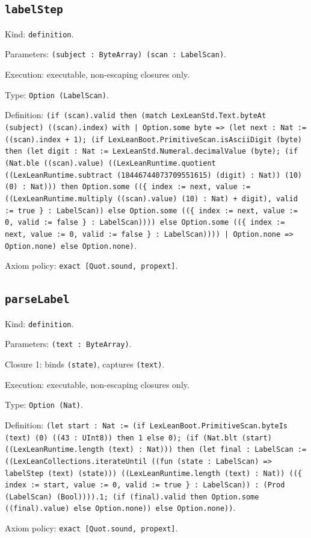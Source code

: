 \documentclass[11pt]{article}
\begin{document}
\subsection*{\texttt{labelStep}}
\noindent Kind: \texttt{definition}.\par
\noindent Parameters: \texttt{(subject : ByteArray) (scan : LabelScan)}.\par
\noindent Execution: executable, non-escaping closures only.\par
\noindent Type: \texttt{Option (LabelScan)}.\par
\noindent Definition: \texttt{(if (scan).valid then (match LexLeanStd.Text.byteAt (subject) ((scan).index) with | Option.some byte => (let next : Nat := ((scan).index + 1); (if LexLeanBoot.PrimitiveScan.isAsciiDigit (byte) then (let digit : Nat := LexLeanStd.Numeral.decimalValue (byte); (if (Nat.ble ((scan).value) ((LexLeanRuntime.quotient ((LexLeanRuntime.subtract (18446744073709551615) (digit) : Nat)) (10) (0) : Nat))) then Option.some ((\{ index := next, value := ((LexLeanRuntime.multiply ((scan).value) (10) : Nat) + digit), valid := true \} : LabelScan)) else Option.some ((\{ index := next, value := 0, valid := false \} : LabelScan)))) else Option.some ((\{ index := next, value := 0, valid := false \} : LabelScan)))) | Option.none => Option.none) else Option.none)}.\par
\noindent Axiom policy: \texttt{exact [Quot.sound, propext]}.\par
\subsection*{\texttt{parseLabel}}
\noindent Kind: \texttt{definition}.\par
\noindent Parameters: \texttt{(text : ByteArray)}.\par
\noindent Closure 1: binds \texttt{(state)}, captures \texttt{(text)}.\par
\noindent Execution: executable, non-escaping closures only.\par
\noindent Type: \texttt{Option (Nat)}.\par
\noindent Definition: \texttt{(let start : Nat := (if LexLeanBoot.PrimitiveScan.byteIs (text) (0) ((43 : UInt8)) then 1 else 0); (if (Nat.blt (start) ((LexLeanRuntime.length (text) : Nat))) then (let final : LabelScan := ((LexLeanCollections.iterateUntil ((fun (state : LabelScan) => labelStep (text) (state))) ((LexLeanRuntime.length (text) : Nat)) ((\{ index := start, value := 0, valid := true \} : LabelScan)) : (Prod (LabelScan) (Bool)))).1; (if (final).valid then Option.some ((final).value) else Option.none)) else Option.none))}.\par
\noindent Axiom policy: \texttt{exact [Quot.sound, propext]}.\par
\end{document}

